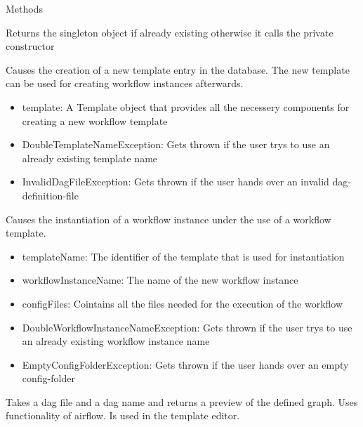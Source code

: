 \begin{methodenv}{Methods}

Returns the singleton object if already existing otherwise it calls the private constructor

Causes the creation of a new template entry in the database. The new template can be used for creating workflow instances afterwards.

\begin{itemize}
	\item{template:}
	A Template object that provides all the necessery components for creating a new workflow template
\end{itemize}

\begin{itemize}
	\item{DoubleTemplateNameException:}
	Gets thrown if the user trys to use an already existing template name
	\item{InvalidDagFileException:}
	Gets thrown if the user hands over an invalid dag-definition-file
\end{itemize}

Causes the instantiation of a workflow instance under the use of a workflow template. 

\begin{itemize}
	\item{templateName:}
	The identifier of the template that is used for instantiation
	\item{workflowInstanceName:}
	The name of the new workflow instance
	\item{configFiles:}
	Cointains all the files needed for the execution of the workflow
\end{itemize}

\begin{itemize}
	\item{DoubleWorkflowInstanceNameException:}
	Gets thrown if the user trys to use an already existing workflow instance name
	\item{EmptyConfigFolderException:}
	Gets thrown if the user hands over an empty config-folder
\end{itemize}

Takes a dag file and a dag name and returns a preview of the defined graph. Uses functionality of airflow. Is used in the template editor.


\end{methodenv}
